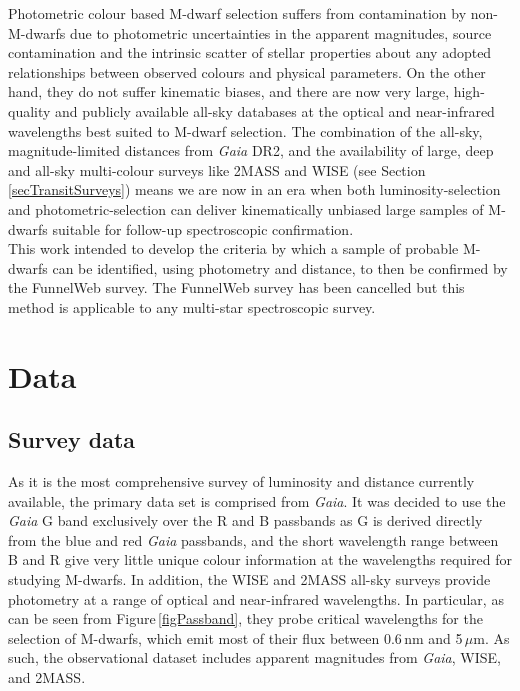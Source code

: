 Photometric colour based M-dwarf selection suffers from contamination by non-M-dwarfs due to photometric uncertainties in the apparent magnitudes, source contamination and the intrinsic scatter of stellar properties about any adopted relationships between observed colours and physical parameters. On the other hand, they do not suffer kinematic biases, and there are now very large, high-quality and publicly available all-sky databases at the optical and near-infrared wavelengths best suited to M-dwarf selection. The combination of the all-sky, magnitude-limited distances from {\em Gaia} DR2, and the availability of large, deep and all-sky multi-colour surveys like 2MASS and WISE (see Section\,\ref{secTransitSurveys}) means we are now in an era when both luminosity-selection and photometric-selection can deliver kinematically unbiased large samples of M-dwarfs suitable for follow-up spectroscopic confirmation.\\

This work intended to develop the criteria by which a sample of probable M-dwarfs can be identified, using photometry and distance, to then be confirmed by the FunnelWeb survey. The FunnelWeb survey has been cancelled but this method is applicable to any multi-star spectroscopic survey.
\section{Data}
\subsection{Survey data}
\label{secObsData}
As it is the most comprehensive survey of luminosity and distance currently available, the primary data set is comprised from {\em Gaia}. It was decided to use the {\em Gaia} G band exclusively over the R and B passbands as G is derived directly from the blue and red {\em Gaia} passbands, and the short wavelength range between B and R give very little unique colour information at the wavelengths required for studying M-dwarfs. In addition, the WISE and 2MASS all-sky surveys provide photometry at a range of optical and near-infrared wavelengths. In particular, as can be seen from Figure\,\ref{figPassband}, they probe critical wavelengths for the selection of M-dwarfs, which emit most of their flux between 0.6\,nm and 5\,$\mu$m. As such, the observational dataset includes apparent magnitudes from {\em Gaia}, WISE, and 2MASS. \\

